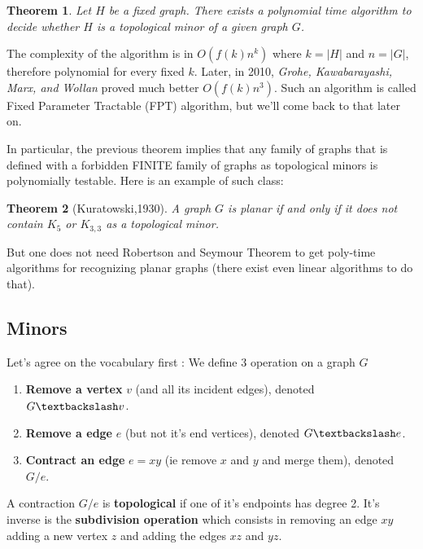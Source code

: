 \documentclass[12pt,a4paper]{article}
\newtheorem{theorem}{Theorem}
\begin{document}
\begin{theorem}
  Let $H$ be a fixed graph.  There exists a polynomial time algorithm to decide
  whether $H$ is a topological minor of a given graph $G$.
\end{theorem}

The complexity of the algorithm is in $O(f(k)n^k)$ where $k=|H|$ and $n=|G|$,
therefore polynomial for every fixed $k$. Later, in 2010, \textit{Grohe,
  Kawabarayashi, Marx, and Wollan} proved much better $O(f(k)n^3)$.  Such an
algorithm is called Fixed Parameter Tractable (FPT) algorithm, but we'll come
back to that later on.

In particular, the previous theorem implies that any family of graphs that is
defined with a forbidden FINITE family of graphs as topological minors is
polynomially testable.  Here is an example of such class:

\begin{theorem}[Kuratowski,1930]
  A graph $G$ is planar if and only if it does not contain $K_5$ or $K_{3,3}$ as
  a topological minor.
\end{theorem}

But one does not need Robertson and Seymour Theorem to get poly-time algorithms
for recognizing planar graphs (there exist even linear algorithms to do that).

\subsection{Minors}

Let's agree on the vocabulary first : We define 3 operation on a graph $G$
\begin{enumerate}

\item \textbf{Remove a vertex} $v$ (and all its incident edges), denoted $G \textbackslash v$.
\item \textbf{Remove a edge} $e$ (but not it's end vertices), denoted $G \textbackslash e$.
\item \textbf{Contract an edge} $e=xy$ (ie remove $x$ and $y$ and merge them), denoted $G/e$.
\end{enumerate}
A contraction $G/e$ is \textbf{topological} if one of it's endpoints has degree 2. It's inverse is the \textbf{subdivision operation} which consists in removing an edge $xy$ adding a new vertex $z$ and adding the edges $xz$ and $yz$.
\end{document}
